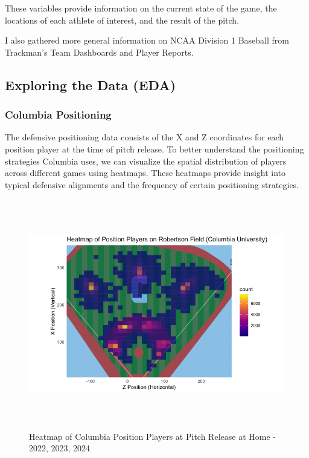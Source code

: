 \documentclass{article}
\begin{document}
These variables provide information on the current state of the game, the locations of each athlete of interest, and the result of the pitch. 

I also gathered more general information on NCAA Division 1 Baseball from Trackman's Team Dashboards and Player Reports. 


\subsection{Exploring the Data (EDA)}

\subsubsection{Columbia Positioning}

The defensive positioning data consists of the X and Z coordinates for each position player at the time of pitch release. To better understand the positioning strategies Columbia uses, we can visualize the spatial distribution of players across different games using heatmaps. These heatmaps provide insight into typical defensive alignments and the frequency of certain positioning strategies.

\vspace{1cm}
\begin{figure}[h]
    \centering        
    \includegraphics[height=10cm]{images/player_heatmap.png}
    \caption{Heatmap of Columbia Position Players at Pitch Release at Home - 2022, 2023, 2024}
\end{figure}
\vspace{1cm}
\end{document}
